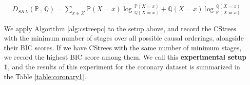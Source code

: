 \documentclass{tufte-book}
\begin{document}
\begin{Definition}
\begin{align*}
D_{SKL}(\mathbb{P} \, , \, \mathbb{Q}) = \sum_{x \in \mathcal{X}} \mathbb{P}(X=x)\log \frac{\mathbb{P}(X = x)}{\mathbb{Q}(X=x)} + \mathbb{Q}(X=x)\log \frac{\mathbb{Q}(X = x)}{\mathbb{P}(X=x)}
\end{align*}


We apply Algorithm \ref{alg:cstreepc} to the setup above, and record the CStrees with the minimum number of stages over all possible causal orderings, alongside their BIC scores. If we have CStrees with the same number of minimum stages, we record the highest BIC score among them. We call this \textbf{experimental setup 1}, and the results of this experiment for the coronary dataset is summarized in the Table \ref{table:coronary1}.






\end{Definition}
\end{document}
